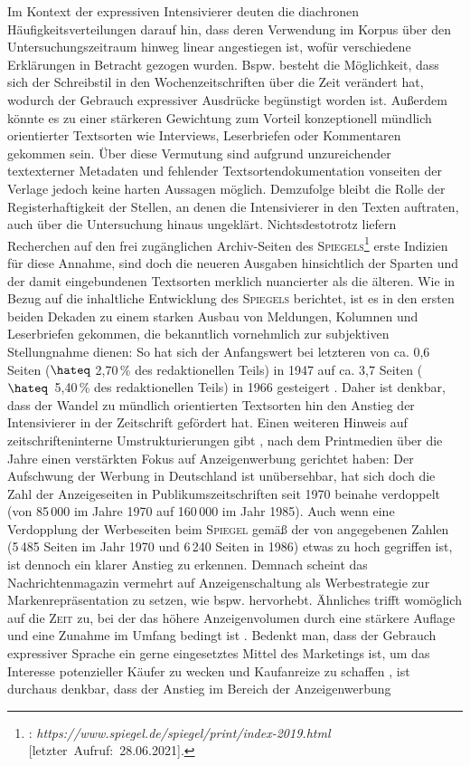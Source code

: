 Im Kontext der expressiven Intensivierer deuten die diachronen Häufigkeitsverteilungen darauf hin, dass deren Verwendung im Korpus über den Untersuchungszeitraum hinweg linear angestiegen ist, wofür verschiedene Erklärungen in Betracht gezogen wurden. Bspw. besteht die Möglichkeit, dass sich der Schreibstil in den Wochenzeitschriften über die Zeit verändert hat, wodurch der Gebrauch expressiver Ausdrücke begünstigt worden ist. Außerdem könnte es zu einer stärkeren Gewichtung zum Vorteil konzeptionell mündlich orientierter Textsorten wie Interviews, Leserbriefen oder Kommentaren gekommen sein. Über diese Vermutung sind aufgrund unzureichender textexterner Metadaten und fehlender Textsortendokumentation vonseiten der Verlage jedoch keine harten Aussagen möglich. Demzufolge bleibt die Rolle der Registerhaftigkeit der Stellen, an denen die Intensivierer in den Texten auftraten, auch über die Untersuchung hinaus ungeklärt. Nichtsdestotrotz liefern Recherchen auf den frei zugänglichen Archiv-Seiten des \textsc{Spiegels}\footnote{\citet[]{Spiegel.2019}: \textit{https://www.spiegel.de/spiegel/print/index-2019.html} [\mbox{letzter Aufruf: 28.06.2021]}.} erste Indizien für diese Annahme, sind doch die neueren Ausgaben hinsichtlich der Sparten und der damit eingebundenen Textsorten merklich nuancierter als die älteren. Wie \mbox{\citet[73ff.\,94]{Just.1967}} in Bezug auf die inhaltliche Entwicklung des \textsc{Spiegels} berichtet, ist es in den ersten beiden Dekaden zu einem starken Ausbau von Meldungen, Kolumnen und Leserbriefen gekommen, die bekanntlich vornehmlich zur subjektiven Stellungnahme dienen: So hat sich der Anfangswert bei letzteren von ca. 0,6 Seiten ($\hateq$ 2,70\,\% des redaktionellen Teils) in 1947 auf ca. 3,7 Seiten \mbox{($\hateq$ 5,40\,\%} des redaktionellen Teils) in 1966 gesteigert \mbox{\citep[vgl.][76]{Just.1967}}. Daher ist denkbar, dass der Wandel zu mündlich orientierten Textsorten hin den Anstieg der Intensivierer in der Zeitschrift gefördert hat. Einen weiteren Hinweis auf zeitschrifteninterne Umstrukturierungen gibt \mbox{\citet[116]{Kuhn.1987}}, nach dem Printmedien über die Jahre einen verstärkten Fokus auf Anzeigenwerbung gerichtet haben: \glqq{}Der Aufschwung der Werbung in Deutschland ist unübersehbar, hat sich doch die Zahl der Anzeigeseiten in Publikumszeitschriften seit 1970 beinahe verdoppelt (von 85\,000 im Jahre 1970 auf 160\,000 im Jahr 1985)\grqq{}. Auch wenn eine Verdopplung der Werbeseiten beim \textsc{Spiegel} gemäß der von \citet[]{Kuhn.1987} angegebenen Zahlen (5\,485 Seiten im Jahr 1970 und 6\,240 Seiten in 1986) etwas zu hoch gegriffen ist, ist dennoch ein klarer Anstieg zu erkennen. Demnach scheint das Nachrichtenmagazin vermehrt auf Anzeigenschaltung als Werbestrategie zur Markenrepräsentation zu setzen, wie bspw. \citet[31f.,\,115]{Just.1967} hervorhebt. Ähnliches trifft womöglich auf die \textsc{Zeit} zu, bei der das höhere Anzeigenvolumen durch eine stärkere Auflage und eine Zunahme im Umfang bedingt ist \mbox{\citep[vgl.][260,\,422]{Jansen.2006}}. Bedenkt man, dass der Gebrauch expressiver Sprache ein gerne eingesetztes Mittel des Marketings ist, um das Interesse potenzieller Käufer zu wecken und Kaufanreize zu schaffen \citep[vgl.][97]{Suscinskij.1985}, ist durchaus denkbar, dass der Anstieg im Bereich der Anzeigenwerbung 